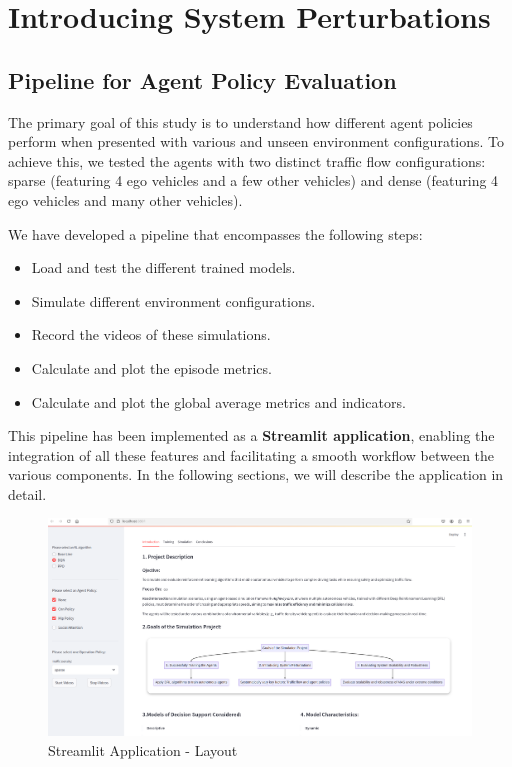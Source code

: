 \section{Introducing System Perturbations}

\subsection{Pipeline for Agent Policy Evaluation}

The primary goal of this study is to understand how different agent policies perform when presented with various and unseen environment configurations. 
To achieve this, we tested the agents with two distinct traffic flow configurations: sparse (featuring 4 ego vehicles and a few other vehicles) 
and dense (featuring 4 ego vehicles and many other vehicles). 

We have developed a pipeline that encompasses the following steps:
\begin{itemize}
    \item Load and test the different trained models.
    \item Simulate different environment configurations.
    \item Record the videos of these simulations.
    \item Calculate and plot the episode metrics.
    \item Calculate and plot the global average metrics and indicators.
\end{itemize}

This pipeline has been implemented as a \textbf{Streamlit application}, enabling the integration of all these features and facilitating a smooth 
workflow between the various components. In the following sections, we will describe the application in detail.

\begin{figure}[H]
    \centering
    \includegraphics[height=0.35\textheight]{images/app_intro.png} 
    \caption{Streamlit Application - Layout}
\end{figure}


